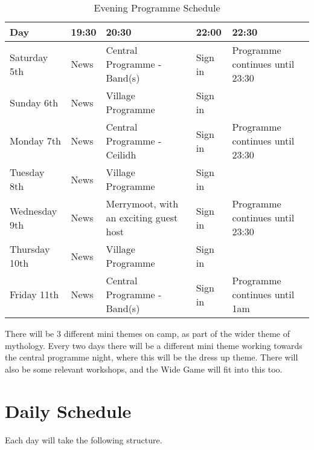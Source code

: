 \documentclass[a4paper, 11pt]{report}
\begin{document}
\begin{table}[H]
    \centering
    {\RaggedRight
    \begin{tabular}{p{} p{} p{} p{} p{}}
    \textbf{Day} & \textbf{19:30} & \textbf{20:30} & \textbf{22:00} & \textbf{22:30} \\
    \hline
    Saturday 5th & News & Central Programme  - Band(s) & Sign in & Programme continues until 23:30 \\
    \hline
    Sunday 6th & News & Village Programme & Sign in &  \\
    \hline
    Monday 7th & News & Central Programme - Ceilidh & Sign in & Programme continues until 23:30 \\
    \hline
    Tuesday 8th & News & Village Programme & Sign in &  \\
    \hline
    Wednesday 9th & News & Merrymoot, with an exciting guest host & Sign in & Programme continues until 23:30 \\
    \hline
    Thursday 10th & News & Village Programme & Sign in &  \\
    \hline
    Friday 11th & News & Central Programme - Band(s) & Sign in & Programme continues until 1am\\
    \hline
    \end{tabular}
    }%
    \caption{Evening Programme Schedule}
\end{table}

There will be 3 different mini themes on camp, as part of the wider theme of mythology. Every two days there will be a different mini theme working towards the central programme night, where this will be the dress up theme. There will also be some relevant workshops, and the Wide Game will fit into this too.

\section{Daily Schedule}
Each day will take the following structure.
\end{document}
